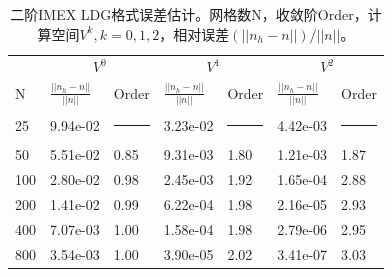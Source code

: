 \begin{table}
	\begin{tabularx}{\textwidth}{@{} *7{X} @{}}
		\toprule
		    & \multicolumn{2}{c}{$V^0$} & \multicolumn{2}{c}{$V^1$} & \multicolumn{2}{c}{$V^2$}                                                                       \\
		\cmidrule(lr){2-3} \cmidrule(lr){4-5} \cmidrule(lr){6-7}
		N   & $\frac{||n_h-n||}{||n||}$ & Order                     & $\frac{||n_h-n||}{||n||}$ & Order              & $\frac{||n_h-n||}{||n||}$ & Order              \\
		\midrule
		25  & 9.94e-02                  & \rule{\len}{0.4pt}        & 3.23e-02                  & \rule{\len}{0.4pt} & 4.42e-03                  & \rule{\len}{0.4pt} \\
		50  & 5.51e-02                  & 0.85                      & 9.31e-03                  & 1.80               & 1.21e-03                  & 1.87               \\
		100 & 2.80e-02                  & 0.98                      & 2.45e-03                  & 1.92               & 1.65e-04                  & 2.88               \\
		200 & 1.41e-02                  & 0.99                      & 6.22e-04                  & 1.98               & 2.16e-05                  & 2.93               \\
		400 & 7.07e-03                  & 1.00                      & 1.58e-04                  & 1.98               & 2.79e-06                  & 2.95               \\
		800 & 3.54e-03                  & 1.00                      & 3.90e-05                  & 2.02               & 3.41e-07                  & 3.03               \\
		\bottomrule
	\end{tabularx}
	\caption{二阶IMEX LDG格式误差估计。网格数N，收敛阶Order，计算空间$V^k, k=0,1,2$，相对误差$(||n_h-n||)/||n||$。}
	\label{tab:IMEXLDGerror:2}
\end{table}

